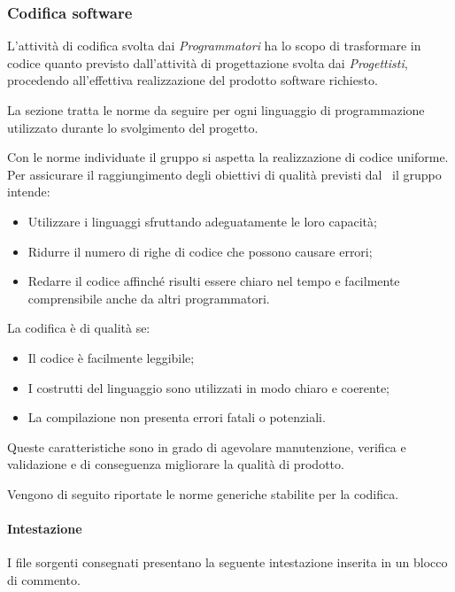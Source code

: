 \subsubsection{Codifica software}
L'attività di codifica svolta dai \textit{Programmatori} ha lo scopo di trasformare in codice quanto previsto dall'attività di progettazione svolta dai \textit{Progettisti}, procedendo all'effettiva realizzazione del prodotto software richiesto.

La sezione tratta le norme da seguire per ogni linguaggio di programmazione utilizzato durante lo svolgimento del progetto.

\label{AspettativeCodifica}Con le norme individuate il gruppo si aspetta la realizzazione di codice uniforme. Per assicurare il raggiungimento degli obiettivi di qualità previsti dal \PdQ\ il gruppo intende:
\begin{itemize}
	\item Utilizzare i linguaggi sfruttando adeguatamente le loro capacità;
	\item Ridurre il numero di righe di codice che possono causare errori;
	\item Redarre il codice affinché risulti essere chiaro nel tempo e facilmente comprensibile anche da altri programmatori.
\end{itemize}

La codifica è di qualità se: 
\begin{itemize}
	\item Il codice è facilmente leggibile;
	\item I costrutti del linguaggio sono utilizzati in modo chiaro e coerente;
	\item La compilazione non presenta errori fatali o potenziali.
\end{itemize}
Queste caratteristiche sono in grado di agevolare manutenzione, verifica e validazione e di conseguenza migliorare la qualità di prodotto.

\label{CodificaConvenzioni}
Vengono di seguito riportate le norme generiche stabilite per la codifica.
\paragraph*{Intestazione}
I file sorgenti consegnati presentano la seguente intestazione inserita in un blocco di commento.
